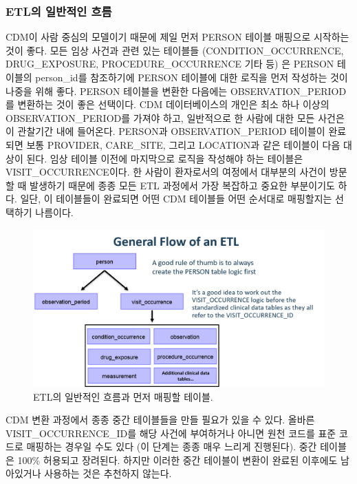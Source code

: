 \documentclass[11pt]{book}
\theoremstyle{definition}
\theoremstyle{definition}
\theoremstyle{definition}
\theoremstyle{remark}
\begin{document}
\subsubsection*{ETL의 일반적인 흐름}\label{etl--}

CDM이 사람 중심의 모델이기 때문에 제일 먼저 PERSON 테이블 매핑으로
시작하는 것이 좋다. 모든 임상 사건과 관련 있는 테이블들
(CONDITION\_OCCURRENCE, DRUG\_EXPOSURE, PROCEDURE\_OCCURRENCE 기타 등)
은 PERSON 테이블의 person\_id를 참조하기에 PERSON 테이블에 대한 로직을
먼저 작성하는 것이 나중을 위해 좋다. PERSON 테이블을 변환한 다음에는
OBSERVATION\_PERIOD를 변환하는 것이 좋은 선택이다. CDM 데이터베이스의
개인은 최소 하나 이상의 OBSERVATION\_PERIOD를 가져야 하고, 일반적으로 한
사람에 대한 모든 사건은 이 관찰기간 내에 들어온다. PERSON과
OBSERVATION\_PERIOD 테이블이 완료되면 보통 PROVIDER, CARE\_SITE, 그리고
LOCATION과 같은 테이블이 다음 대상이 된다. 임상 테이블 이전에 마지막으로
로직을 작성해야 하는 테이블은 VISIT\_OCCURRENCE이다. 한 사람이
환자로서의 여정에서 대부분의 사건이 방문할 때 발생하기 때문에 종종 모든
ETL 과정에서 가장 복잡하고 중요한 부분이기도 하다. 일단, 이 테이블들이
완료되면 어떤 CDM 테이블들 어떤 순서대로 매핑할지는 선택하기 나름이다.

\begin{figure}

{\centering \includegraphics[width=1\linewidth]{images/ExtractTransformLoad/flowOfEtl} 

}

\caption{ETL의 일반적인 흐름과 먼저 매핑할 테이블.}\label{fig:etlFlow}
\end{figure}

CDM 변환 과정에서 종종 중간 테이블들을 만들 필요가 있을 수 있다. 올바른
VISIT\_OCCURRENCE\_ID를 해당 사건에 부여하거나 아니면 원천 코드를 표준
코드로 매핑하는 경우일 수도 있다 (이 단계는 종종 매우 느리게 진행된다).
중간 테이블은 100\% 허용되고 장려된다. 하지만 이러한 중간 테이블이
변환이 완료된 이후에도 남아있거나 사용하는 것은 추천하지 않는다.
\end{document}
